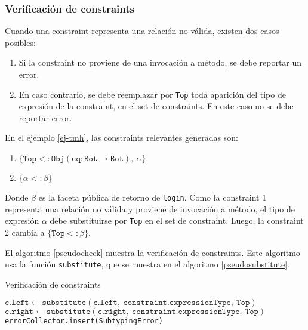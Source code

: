 \subsubsection{Verificación de constraints}
Cuando una constraint representa una relación no válida, existen dos casos posibles:

\begin{enumerate}
  \item Si la constraint no proviene de una invocación a método, se debe reportar un error.
  \item En caso contrario, se debe reemplazar por \texttt{Top} toda aparición del tipo de expresión de la constraint, en el set de constraints. En este caso no se debe reportar error.
\end{enumerate}

En el ejemplo \ref{ej-tmh}, las constraints relevantes generadas son:

\begin{enumerate}
  \item $\{\mathtt{Top <: Obj(eq: Bot \rightarrow Bot),\ \alpha}\}$
  \item $\{\mathtt{\alpha <: \beta}\}$
\end{enumerate}

Donde $\beta$ es la faceta pública de retorno de \texttt{login}. Como la constraint 1 representa una relación no válida y proviene de invocación a método, el tipo de expresión $\alpha$ debe substituirse por \texttt{Top} en el set de constraint. Luego, la constraint 2 cambia a $\{\mathtt{Top <: \beta}\}$.

El algoritmo \ref{pseudocheck} muestra la verificación de constraints. Este algoritmo usa la función \texttt{substitute}, que se muestra en el algoritmo \ref{pseudosubstitute}.

\begin{algorithm}\captionsetup{labelsep=newline}
  \centering
  \caption{Verificación de constraints}
  \label{pseudocheck}
    \begin{algorithmic}[1]
                \State $\mathtt{c.left\gets substitute(c.left,\ constraint.expressionType,\ Top)}$
                \State $\mathtt{c.right\gets substitute(c.right,\ constraint.expressionType,\ Top)}$
              \EndFor
              \State \texttt{errorCollector.insert(SubtypingError)}
            \EndIf
          \EndFor
      \EndFunction
    \end{algorithmic}
\end{algorithm}

